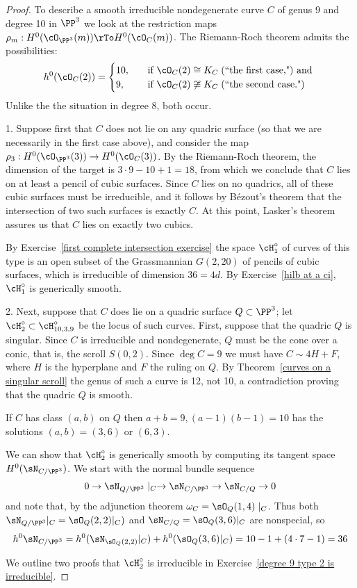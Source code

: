 \begin{proof}
To describe a smooth irreducible nondegenerate curve $C$ of genus 9 and degree 10 in $\PP^{3}$  we look at the restriction maps $\rho_m: H^0(\cO_{\PP^3}(m)) \rTo H^0(\cO_C(m))$. The Riemann-Roch theorem admits the possibilities:
\begin{align*}
h^0(\cO_C(2)) =
\begin{cases}
10, \quad &\text{if } \cO_C(2) \cong K_C \; \text{(``the first case,") and } \\
9,  \quad &\text{if } \cO_C(2) \not\cong K_C  \; \text{(``the second case.")}
\end{cases}
\end{align*}
Unlike the the situation in degree 8, both occur.

1. Suppose first that $C$ does not lie on any quadric surface (so that we are necessarily in the first case above), and consider the map $\rho_3 : H^0(\cO_{\PP^3}(3)) \to H^0(\cO_C(3))$. By the Riemann-Roch theorem, the dimension of the target is $3\cdot 9 - 10 + 1 = 18$, from which we conclude that $C$ lies on at least a pencil of cubic surfaces. Since $C$ lies on no quadrics, all of these cubic surfaces must be irreducible, and it follows by B\'ezout's theorem that the intersection of two such surfaces is exactly $C$. At this point, Lasker's theorem assures us that $C$ lies on exactly two cubics.

By Exercise~\ref{first complete intersection exercise} the space $\cH^\circ_1$ of curves of this type is an open subset of the Grassmannian $G(2,20)$ of pencils of cubic surfaces, which is irreducible of dimension $36 = 4d$. By Exercise~\ref{hilb at a ci}, $\cH^\circ_1$ is generically smooth.

2. Next, suppose that $C$ does lie on a quadric surface $Q \subset \PP^3$; let $\cH^\circ_2 \subset \cH^\circ_{10,3,9}$ be the locus of such curves. First, suppose that the quadric $Q$ is singular. Since $C$ is irreducible and nondegenerate,
$Q$ must be the cone over a conic, that is, the scroll $S(0,2)$. Since $\deg C = 9$ we must have 
$C\sim 4H+F$, where $H$ is the hyperplane and $F$ the ruling on $Q$. By Theorem~\ref{curves on a singular scroll}
the genus of such a curve is 12, not 10, a contradiction proving that the quadric $Q$ is smooth.

If $C$ has class $(a,b)$ on $Q$ then $a+b= 9, (a-1)(b-1) = 10$ has the solutions $(a,b) = (3,6)$ or $(6,3)$.

We can show that $\cH^\circ_2$ is generically smooth by computing its tangent space
$H^0(\sN_{C/\PP^3})$. We start with the normal bundle sequence
$$
0\to \sN_{Q/\PP^3}\mid_C \to \sN_{C/\PP^3} \to \sN_{C/Q} \to 0
$$
and note that, by the adjunction theorem $\omega_C = \sO_Q(1,4)\mid_C$.
Thus both $\sN_{Q/\PP^3}|_C = \sO_Q(2,2)|_C)$ and
$\sN_{C/Q} = \sO_Q(3,6)|_C$ are nonspecial, so 
$$
h^0 \sN_{C/\PP^3} = h^0(\sN_{\sO_Q(2,2)}|_C ) + h^0(\sO_Q(3,6)|_C)
= 10-1 + (4\cdot 7-1) = 36
$$

We outline two proofs that 
$\cH^\circ_2$ is irreducible in Exercise~\ref{degree 9 type 2 is irreducible}.
\end{proof}

